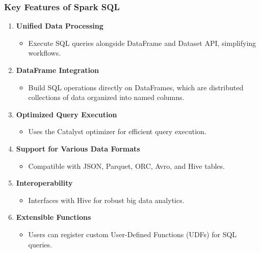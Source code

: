 \documentclass[aspectratio=169]{beamer}
\begin{document}
\begin{frame}
    \frametitle{Key Features of Spark SQL}
    \begin{enumerate}
        \item \textbf{Unified Data Processing}
        \begin{itemize}
            \item Execute SQL queries alongside DataFrame and Dataset API, simplifying workflows.
        \end{itemize}
        
        \item \textbf{DataFrame Integration}
        \begin{itemize}
            \item Build SQL operations directly on DataFrames, which are distributed collections of data organized into named columns.
        \end{itemize}
        
        \item \textbf{Optimized Query Execution}
        \begin{itemize}
            \item Uses the Catalyst optimizer for efficient query execution.
        \end{itemize}
        
        \item \textbf{Support for Various Data Formats}
        \begin{itemize}
            \item Compatible with JSON, Parquet, ORC, Avro, and Hive tables.
        \end{itemize}
        
        \item \textbf{Interoperability}
        \begin{itemize}
            \item Interfaces with Hive for robust big data analytics.
        \end{itemize}
        
        \item \textbf{Extensible Functions}
        \begin{itemize}
            \item Users can register custom User-Defined Functions (UDFs) for SQL queries.
        \end{itemize}
    \end{enumerate}
\end{frame}
\end{document}
